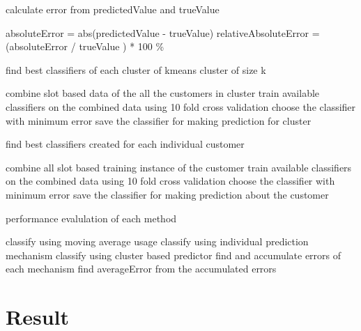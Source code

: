 \begin{algorithm}
\caption{calculate error from predictedValue and trueValue}
\begin{algorithmic} 
\STATE absoluteError = abs(predictedValue - trueValue)
\STATE relativeAbsoluteError = (absoluteError / trueValue ) * 100 \%
\end{algorithmic}
\end{algorithm}

\begin{algorithm}
\caption{find best classifiers of each cluster of kmeans cluster of size k}
\begin{algorithmic}
	\STATE combine slot based data of the all the customers in cluster
	\STATE train available classifiers on the combined data using 10 fold cross validation
	\STATE choose the classifier with minimum error
	\STATE save the classifier for making prediction for cluster
\ENDFOR 
\end{algorithmic}
\end{algorithm}

\begin{algorithm}
\caption{find best classifiers created for each individual customer}
\begin{algorithmic}
	\STATE combine all slot based training instance of the customer
	\STATE train available classifiers on the combined data using 10 fold cross validation
	\STATE choose the classifier with minimum error
	\STATE save the classifier for making prediction about the customer
\ENDFOR 
\end{algorithmic}
\end{algorithm}

\begin{algorithm}
\caption{performance evalulation of each method}
\begin{algorithmic}
	\STATE classify using moving average usage
	\STATE classify using individual prediction mechanism
	\STATE classify using cluster based predictor
	\STATE find and accumulate errors of each mechanism
\ENDFOR 
\STATE find averageError from the accumulated errors
\end{algorithmic}
\end{algorithm}


\section{Result}
